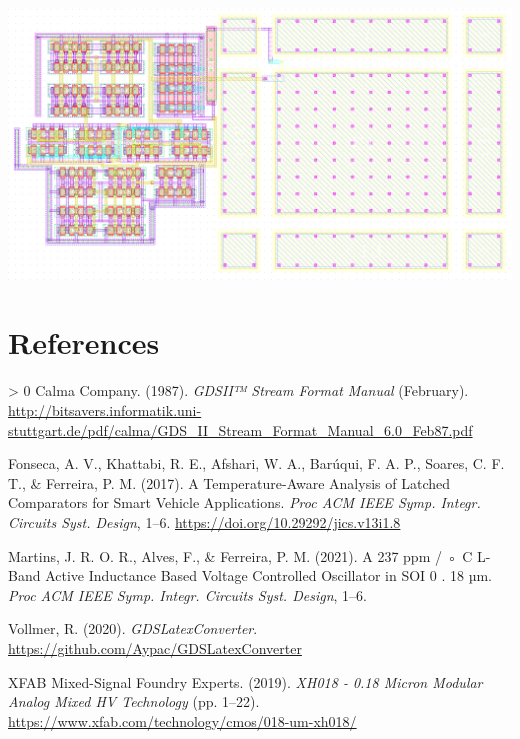\documentclass[10pt,a4paper,onecolumn]{article}
\let\textttOrig=\texttt
\def\texttt#1{\expandafter\textttOrig{\seqsplit{#1}}}
\newlength{\cslhangindent}
\newenvironment{CSLReferences}[3] %
 {%
  \setlength{\parindent}{0pt}
  \ifodd #1 \everypar{\setlength{\hangindent}{\cslhangindent}}\ignorespaces\fi
  \ifnum #2 > 0
  \setlength{\parskip}{#2\baselineskip}
  \fi
 }%
 {}
\let\addcontentslineOrig=\addcontentsline
\def\addcontentsline#1#2#3{\bgroup
  \let\texttt=\textttOrig\addcontentslineOrig{#1}{#2}{#3}\egroup}
\begin{document}
\includegraphics{img/OTA_original.png}%

\hypertarget{references}{%
\section*{References}\label{references}}

\hypertarget{refs}{}
\begin{CSLReferences}{1}{0}
\leavevmode\hypertarget{ref-Calma1987}{}%
Calma Company. (1987). \emph{{GDSII™ Stream Format Manual}} (February).
\url{http://bitsavers.informatik.uni-stuttgart.de/pdf/calma/GDS_II_Stream_Format_Manual_6.0_Feb87.pdf}

\leavevmode\hypertarget{ref-Fonseca2017}{}%
Fonseca, A. V., Khattabi, R. E., Afshari, W. A., Barúqui, F. A. P.,
Soares, C. F. T., \& Ferreira, P. M. (2017). {A Temperature-Aware
Analysis of Latched Comparators for Smart Vehicle Applications}.
\emph{Proc ACM IEEE Symp. Integr. Circuits Syst. Design}, 1--6.
\url{https://doi.org/10.29292/jics.v13i1.8}

\leavevmode\hypertarget{ref-}{}%
Martins, J. R. O. R., Alves, F., \& Ferreira, P. M. (2021). {A 237 ppm /
◦ C L-Band Active Inductance Based Voltage Controlled Oscillator in SOI
0 . 18 µm}. \emph{Proc ACM IEEE Symp. Integr. Circuits Syst. Design},
1--6.

\leavevmode\hypertarget{ref-Vollmer2020}{}%
Vollmer, R. (2020). \emph{{GDSLatexConverter}}.
\url{https://github.com/Aypac/GDSLatexConverter}

\leavevmode\hypertarget{ref-XFAB2019}{}%
XFAB Mixed-Signal Foundry Experts. (2019). \emph{{XH018 - 0.18 Micron
Modular Analog Mixed HV Technology}} (pp. 1--22).
\url{https://www.xfab.com/technology/cmos/018-um-xh018/}

\end{CSLReferences}
\end{document}
